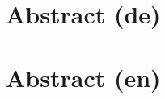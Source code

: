 
\section{Abstract (de)}\label{sec:abstract_de_}

\lipsum[1]

\section{Abstract (en)}\label{sec:abstract_en_}

\lipsum[1]


